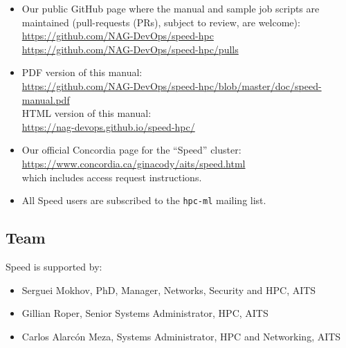 \documentclass{easychair}
\begin{document}
\begin{itemize}
\item
Our public GitHub page where the manual and sample job scripts
are maintained (pull-requests (PRs), subject to review, are welcome):\\
\url{https://github.com/NAG-DevOps/speed-hpc}\\
\url{https://github.com/NAG-DevOps/speed-hpc/pulls}

\item
PDF version of this manual:\\
\url{https://github.com/NAG-DevOps/speed-hpc/blob/master/doc/speed-manual.pdf}\\
HTML version of this manual:\\
\url{https://nag-devops.github.io/speed-hpc/}

\item
Our official Concordia page for the ``Speed'' cluster:\\
\url{https://www.concordia.ca/ginacody/aits/speed.html}\\
which includes access request instructions.

\item
All Speed users are subscribed to the \texttt{hpc-ml} mailing
list.

\nocite{speed-intro-preso}

\end{itemize}

\subsection{Team}
\label{sect:speed-team}

Speed is supported by:

\begin{itemize}
	\item 
Serguei Mokhov, PhD, Manager, Networks, Security and HPC, AITS
	\item 
Gillian Roper, Senior Systems Administrator, HPC, AITS
	\item 
Carlos Alarcón Meza, Systems Administrator, HPC and Networking, AITS
\end{itemize}
\end{document}
